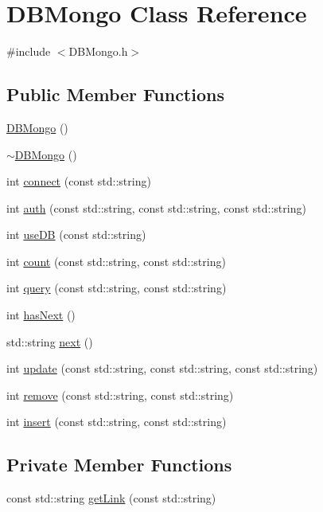 \hypertarget{classDBMongo}{\section{\-D\-B\-Mongo \-Class \-Reference}
\label{classDBMongo}
}


{\ttfamily \#include $<$\-D\-B\-Mongo.\-h$>$}

\subsection*{\-Public \-Member \-Functions}
\begin{DoxyCompactItemize}
\item 
\hyperlink{classDBMongo_a62cbd6424bbde08df864612e002b795a}{\-D\-B\-Mongo} ()
\item 
\hyperlink{classDBMongo_a5efce15a6942d210a6c3635f84ab5b64}{$\sim$\-D\-B\-Mongo} ()
\item 
int \hyperlink{classDBMongo_a0c633e9007fc2ec0cc775986e4cb1794}{connect} (const std\-::string)
\item 
int \hyperlink{classDBMongo_a2e617b209777d76700e9ccf7cc94e0e0}{auth} (const std\-::string, const std\-::string, const std\-::string)
\item 
int \hyperlink{classDBMongo_a92fce59813d1f78a929f303918591b88}{use\-D\-B} (const std\-::string)
\item 
int \hyperlink{classDBMongo_a47f37fc41372135005423f291a5a620a}{count} (const std\-::string, const std\-::string)
\item 
int \hyperlink{classDBMongo_a0bad4f3699bbf6666a55df76e93c9486}{query} (const std\-::string, const std\-::string)
\item 
int \hyperlink{classDBMongo_ab33c2f434dfde82f8482b83516f9aa5b}{has\-Next} ()
\item 
std\-::string \hyperlink{classDBMongo_aae74e2544dfb01b0d59e2ed7ba5fb2cf}{next} ()
\item 
int \hyperlink{classDBMongo_a34b43cbaa54ad0c7501d6431fe46d978}{update} (const std\-::string, const std\-::string, const std\-::string)
\item 
int \hyperlink{classDBMongo_a3fa19733154817348dfbf094fdbeb148}{remove} (const std\-::string, const std\-::string)
\item 
int \hyperlink{classDBMongo_a629d3338a78cbecd51c84bf1bbc3b94e}{insert} (const std\-::string, const std\-::string)
\end{DoxyCompactItemize}
\subsection*{\-Private \-Member \-Functions}
\begin{DoxyCompactItemize}
\item 
const std\-::string \hyperlink{classDBMongo_ae5c8a9211b0e679c2150d250482ee8e1}{get\-Link} (const std\-::string)
\end{DoxyCompactItemize}
